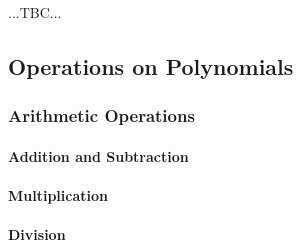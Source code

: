 ...TBC...




\subsection{Operations on Polynomials}

\subsubsection{Arithmetic Operations}

\paragraph{Addition and Subtraction}

\paragraph{Multiplication}

\paragraph{Division}

